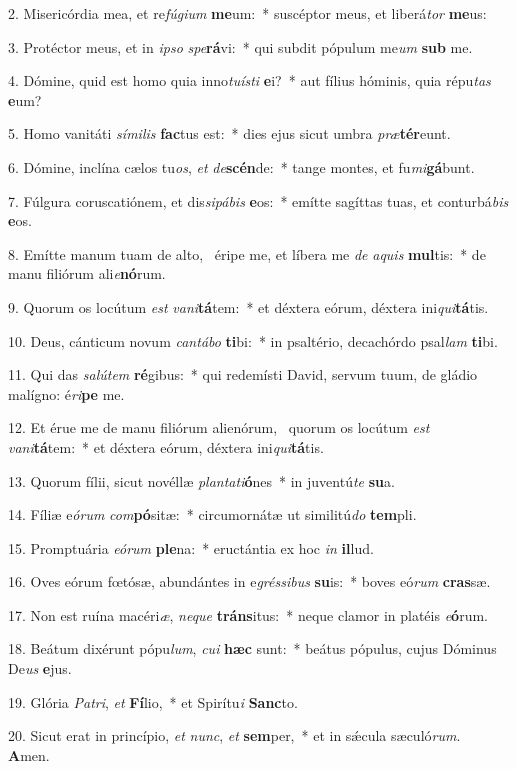 2. Misericórdia mea, et re\textit{fú}\textit{gi}\textit{um} \textbf{me}um:~*  suscéptor meus, et liberá\textit{tor} \textbf{me}us:\

3. Protéctor meus, et in \textit{ip}\textit{so} \textit{spe}\textbf{rá}vi:~*  qui subdit pópulum me\textit{um} \textbf{sub} me.\

4. Dómine, quid est homo quia inno\textit{tu}\textit{ís}\textit{ti} \textbf{e}i?~*  aut fílius hóminis, quia répu\textit{tas} \textbf{e}um?\

5. Homo vanitáti \textit{sí}\textit{mi}\textit{lis} \textbf{fac}tus est:~*  dies ejus sicut umbra \textit{præ}\textbf{tér}eunt.\

6. Dómine, inclína cælos tu\textit{os}, \textit{et} \textit{de}\textbf{scén}de:~*  tange montes, et fu\textit{mi}\textbf{gá}bunt.\

7. Fúlgura coruscatiónem, et dis\textit{si}\textit{pá}\textit{bis} \textbf{e}os:~*  emítte sagíttas tuas, et conturbá\textit{bis} \textbf{e}os.\

8. Emítte manum tuam de alto, \dag\  éripe me, et líbera me \textit{de} \textit{a}\textit{quis} \textbf{mul}tis:~*  de manu filiórum ali\textit{e}\textbf{nó}rum.\

9. Quorum os locútum \textit{est} \textit{va}\textit{ni}\textbf{tá}tem:~*  et déxtera eórum, déxtera ini\textit{qui}\textbf{tá}tis.\

10. Deus, cánticum novum \textit{can}\textit{tá}\textit{bo} \textbf{ti}bi:~*  in psaltério, decachórdo psal\textit{lam} \textbf{ti}bi.\

11. Qui das \textit{sa}\textit{lú}\textit{tem} \textbf{ré}gibus:~*  qui redemísti David, servum tuum, de gládio malígno: é\textit{ri}\textbf{pe} me.\

12. Et érue me de manu filiórum alienórum, \dag\  quorum os locútum \textit{est} \textit{va}\textit{ni}\textbf{tá}tem:~*  et déxtera eórum, déxtera ini\textit{qui}\textbf{tá}tis.\

13. Quorum fílii, sicut novéllæ \textit{plan}\textit{ta}\textit{ti}\textbf{ó}nes~*  in juventú\textit{te} \textbf{su}a.\

14. Fíliæ e\textit{ó}\textit{rum} \textit{com}\textbf{pó}sitæ:~*  circumornátæ ut similitú\textit{do} \textbf{tem}pli.\

15. Promptuária \textit{e}\textit{ó}\textit{rum} \textbf{ple}na:~*  eructántia ex hoc \textit{in} \textbf{il}lud.\

16. Oves eórum fœtósæ, abundántes in e\textit{grés}\textit{si}\textit{bus} \textbf{su}is:~*  boves eó\textit{rum} \textbf{cras}sæ.\

17. Non est ruína macéri\textit{æ}, \textit{ne}\textit{que} \textbf{tráns}itus:~*  neque clamor in platéis \textit{e}\textbf{ó}rum.\

18. Beátum dixérunt pópu\textit{lum}, \textit{cu}\textit{i} \textbf{hæc} sunt:~*  beátus pópulus, cujus Dóminus De\textit{us} \textbf{e}jus.\

19. Glória \textit{Pa}\textit{tri}, \textit{et} \textbf{Fí}lio,~*  et Spirítu\textit{i} \textbf{Sanc}to.\

20. Sicut erat in princípio, \textit{et} \textit{nunc}, \textit{et} \textbf{sem}per,~*  et in sǽcula sæculó\textit{rum}. \textbf{A}men.\

